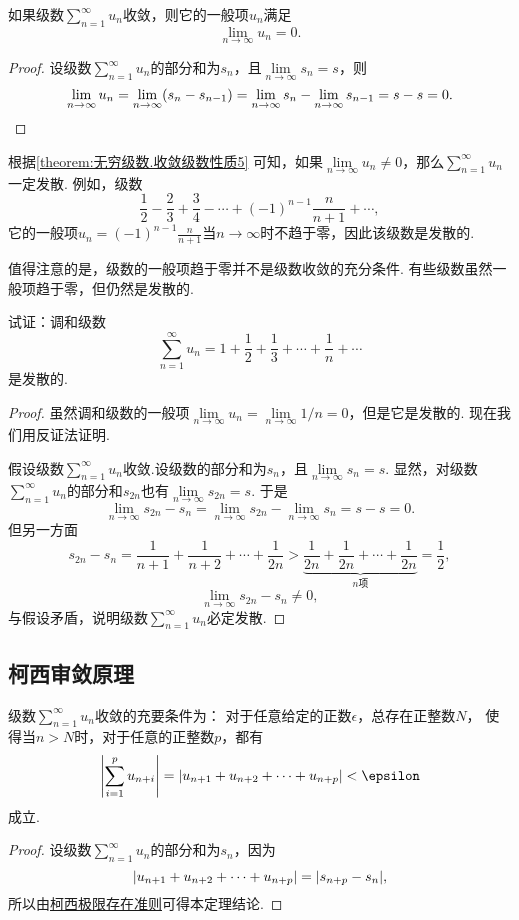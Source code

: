 \begin{property}[级数收敛的必要条件]\label{theorem:无穷级数.收敛级数性质5}
如果级数\(\sum\limits_{n=1}^\infty u_n\)收敛，则它的一般项\(u_n\)满足\[
\lim\limits_{n\to\infty} u_n = 0.
\]
\begin{proof}
设级数\(\sum\limits_{n=1}^\infty u_n\)的部分和为\(s_n\)，且\(\lim\limits_{n\to\infty} s_n = s\)，则\[
\lim\limits_{n\to\infty} u_n = \lim\limits_{n\to\infty}(s_n - s_{n-1}) = \lim\limits_{n\to\infty} s_n - \lim\limits_{n\to\infty} s_{n-1} = s - s = 0.
\qedhere
\]
\end{proof}
\end{property}

根据\cref{theorem:无穷级数.收敛级数性质5} 可知，如果\(\lim\limits_{n\to\infty} u_n \neq 0\)，那么\(\sum\limits_{n=1}^\infty u_n\)一定发散.
例如，级数\[
\frac{1}{2}-\frac{2}{3}+\frac{3}{4}-\dotsb+(-1)^{n-1}\frac{n}{n+1}+\dotsb,
\]它的一般项\(u_n = (-1)^{n-1} \frac{n}{n+1}\)当\(n\to\infty\)时不趋于零，因此该级数是发散的.

值得注意的是，级数的一般项趋于零并不是级数收敛的充分条件.
有些级数虽然一般项趋于零，但仍然是发散的.
\begin{example}\label{example:无穷级数.调和级数的收敛性}
试证：调和级数\[
\sum\limits_{n=1}^\infty u_n = 1+\frac{1}{2}+\frac{1}{3}+\dotsb+\frac{1}{n}+\dotsb
\]是发散的.
\begin{proof}
虽然调和级数的一般项\(\lim\limits_{n\to\infty} u_n = \lim\limits_{n\to\infty} 1/n = 0\)，但是它是发散的.
现在我们用反证法证明.

假设级数\(\sum\limits_{n=1}^\infty u_n\)收敛.设级数的部分和为\(s_n\)，且\(\lim\limits_{n\to\infty} s_n = s\).
显然，对级数\(\sum\limits_{n=1}^\infty u_n\)的部分和\(s_{2n}\)也有\(\lim\limits_{n\to\infty} s_{2n} = s\).
于是\[
\lim\limits_{n\to\infty} {s_{2n}-s_n} = \lim\limits_{n\to\infty} s_{2n} - \lim\limits_{n\to\infty} s_n = s - s = 0.
\]但另一方面\[
s_{2n} - s_n = \frac{1}{n+1}+\frac{1}{n+2}+\dotsb+\frac{1}{2n}
> \underbrace{\frac{1}{2n}+\frac{1}{2n}+\dotsb+\frac{1}{2n}}_{n\text{项}}
= \frac{1}{2},
\]\[
\lim\limits_{n\to\infty} {s_{2n}-s_n} \neq 0,
\]与假设矛盾，说明级数\(\sum\limits_{n=1}^\infty u_n\)必定发散.
\end{proof}
\end{example}

\subsection{柯西审敛原理}
\begin{theorem}[柯西审敛原理]\label{theorem:无穷级数.级数的柯西审敛原理}
级数\(\sum\limits_{n=1}^\infty u_n\)收敛的充要条件为：
对于任意给定的正数\(\epsilon\)，总存在正整数\(N\)，
使得当\(n>N\)时，对于任意的正整数\(p\)，都有\[
\abs{ \sum\limits_{i=1}^p u_{n+i} }
= \abs{u_{n+1}+u_{n+2}+\dotsb+u_{n+p}}
< \epsilon
\]成立.
\begin{proof}
设级数\(\sum\limits_{n=1}^\infty u_n\)的部分和为\(s_n\)，因为\[
\abs{u_{n+1}+u_{n+2}+\dotsb+u_{n+p}} = \abs{s_{n+p}-s_n},
\]所以由\hyperref[theorem:极限.数列的柯西极限存在准则]{柯西极限存在准则}可得本定理结论.
\end{proof}
\end{theorem}

